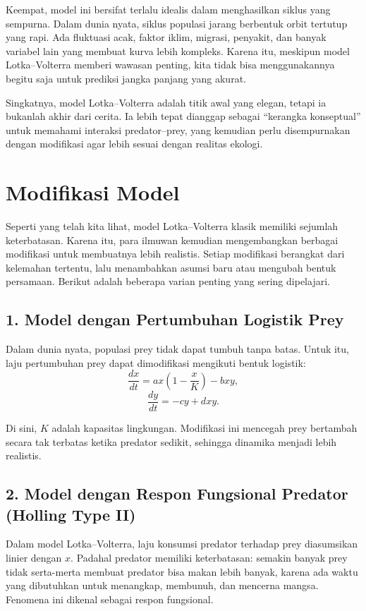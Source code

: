 \documentclass{bukumjh}
\begin{document}
Keempat, model ini bersifat {\jsg terlalu idealis dalam menghasilkan siklus yang sempurna}. Dalam dunia nyata, siklus populasi jarang berbentuk orbit tertutup yang rapi. Ada fluktuasi acak, faktor iklim, migrasi, penyakit, dan banyak variabel lain yang membuat kurva lebih kompleks. Karena itu, meskipun model Lotka–Volterra memberi wawasan penting, kita tidak bisa menggunakannya begitu saja untuk prediksi jangka panjang yang akurat.

Singkatnya, model Lotka–Volterra adalah titik awal yang elegan, tetapi ia bukanlah akhir dari cerita. Ia lebih tepat dianggap sebagai “kerangka konseptual” untuk memahami interaksi predator–prey, yang kemudian perlu disempurnakan dengan modifikasi agar lebih sesuai dengan realitas ekologi.

\section{Modifikasi Model}

Seperti yang telah kita lihat, model Lotka–Volterra klasik memiliki sejumlah keterbatasan. Karena itu, para ilmuwan kemudian mengembangkan berbagai modifikasi untuk membuatnya lebih realistis. Setiap modifikasi berangkat dari kelemahan tertentu, lalu menambahkan asumsi baru atau mengubah bentuk persamaan. Berikut adalah beberapa varian penting yang sering dipelajari.

\subsection*{1. Model dengan Pertumbuhan Logistik Prey}

Dalam dunia nyata, populasi prey tidak dapat tumbuh tanpa batas. Untuk itu, laju pertumbuhan prey dapat dimodifikasi mengikuti bentuk logistik:
\[
\frac{dx}{dt} = ax\left(1 - \frac{x}{K}\right) - bxy,
\]
\[
\frac{dy}{dt} = -cy + dxy.
\]

Di sini, $K$ adalah kapasitas lingkungan. Modifikasi ini mencegah prey bertambah secara tak terbatas ketika predator sedikit, sehingga dinamika menjadi lebih realistis.

\subsection*{2. Model dengan Respon Fungsional Predator (Holling Type II)}

Dalam model Lotka–Volterra, laju konsumsi predator terhadap prey diasumsikan linier dengan $x$. Padahal predator memiliki keterbatasan: semakin banyak prey tidak serta-merta membuat predator bisa makan lebih banyak, karena ada waktu yang dibutuhkan untuk menangkap, membunuh, dan mencerna mangsa. Fenomena ini dikenal sebagai {\jsg respon fungsional}.
\end{document}
